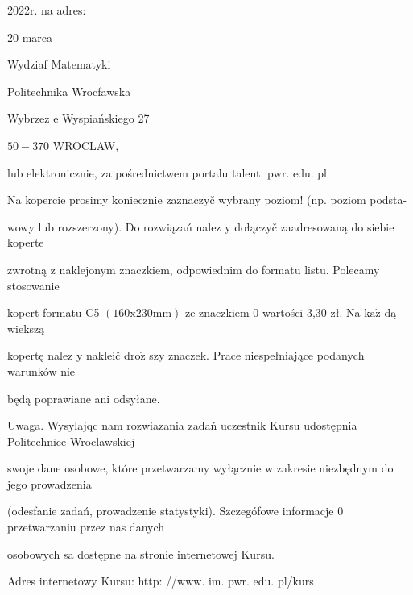 \documentclass[a4paper,12pt]{article}
\begin{document}
2022r. na adres:

20 marca

Wydziaf Matematyki

Politechnika Wrocfawska

Wybrzez $\mathrm{e}$ Wyspiańskiego 27

$50-370$ WROCLAW,

lub elektronicznie, za pośrednictwem portalu talent. $\mathrm{p}\mathrm{w}\mathrm{r}$. edu. pl

Na kopercie prosimy $\underline{\mathrm{k}\mathrm{o}\mathrm{n}\mathrm{i}\mathrm{e}\mathrm{c}\mathrm{z}\mathrm{n}\mathrm{i}\mathrm{e}}$ zaznaczyč wybrany poziom! (np. poziom podsta-

wowy lub rozszerzony). Do rozwiązań nalez $\mathrm{y}$ dołączyč zaadresowaną do siebie koperte

zwrotną $\mathrm{z}$ naklejonym znaczkiem, odpowiednim do formatu listu. Polecamy stosowanie

kopert formatu C5 $(160\mathrm{x}230\mathrm{m}\mathrm{m})$ ze znaczkiem $0$ wartości 3,30 zł. Na $\mathrm{k}\mathrm{a}\dot{\mathrm{z}}$ dą wiekszą

kopertę nalez $\mathrm{y}$ nakleič $\mathrm{d}\mathrm{r}\mathrm{o}\dot{\mathrm{z}}$ szy znaczek. Prace niespełniające podanych warunków nie

będą poprawiane ani odsyłane.

Uwaga. Wysylajqc nam rozwiazania zadań uczestnik Kursu udostępnia Politechnice Wroclawskiej

swoje dane osobowe, które przetwarzamy wyłącznie $\mathrm{w}$ zakresie niezbędnym do jego prowadzenia

(odesfanie zadań, prowadzenie statystyki). Szczegófowe informacje $0$ przetwarzaniu przez nas danych

osobowych sa dostępne na stronie internetowej Kursu.

Adres internetowy Kursu: http: //www. im. pwr. edu. pl/kurs
\end{document}
